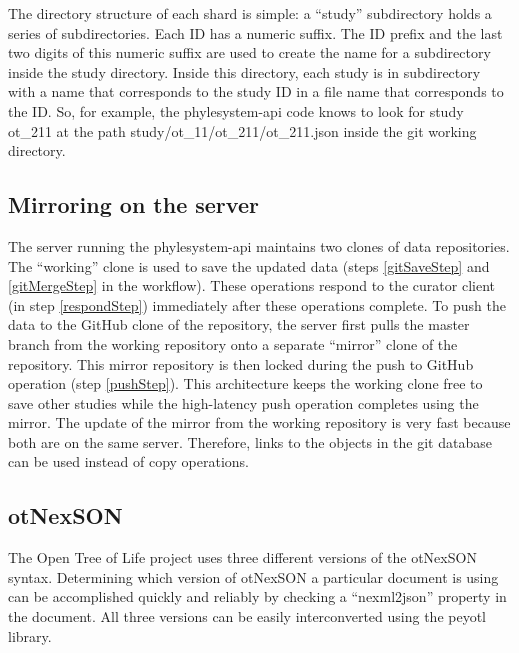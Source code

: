 \documentclass{bioinfo}
\newcommand{\ps}{phylesystem\xspace}
\newcommand{\otol}{Open Tree of Life\xspace}
\newcommand{\nexson}{otNexSON\xspace}
\begin{document}
\begin{methods}
The directory structure of each shard is simple: a ``study'' subdirectory holds 
a series of subdirectories.
Each ID has a numeric suffix.
The ID prefix and the last two digits of this numeric suffix are used to create the name
    for a subdirectory inside the study directory.
Inside this directory, each study is in subdirectory with a name that corresponds to the study ID
    in a file name that corresponds to the ID.
So, for example, the \ps-api code knows to look for study ot\_211 at the path
    study/ot\_11/ot\_211/ot\_211.json inside the git working directory.
\subsection*{Mirroring on the server}
The server running the \ps-api maintains two clones of data repositories.
The ``working'' clone is used to save the updated data (steps \ref{gitSaveStep} and \ref{gitMergeStep} in the workflow).
These operations respond to the curator client (in step \ref{respondStep}) immediately
    after these operations complete.
To push the data to the GitHub clone of the repository, the server first pulls the master branch from the working repository onto a separate
    ``mirror'' clone of the repository.
This mirror repository is then locked during the push to GitHub operation (step \ref{pushStep}).
This architecture keeps the working clone free to save other studies while the high-latency push operation completes using the mirror.
The update of the mirror from the working repository is very fast because both are on the same server.
Therefore, links to the objects in the git database can be used instead of copy operations.

\subsection*{\nexson}
The \otol project uses three different versions of the \nexson syntax.
Determining which version of \nexson a particular document is using
    can be accomplished quickly and reliably by checking a  ``nexml2json'' property in the document.
All three versions can be easily interconverted using the peyotl library.


\end{methods}
\end{document}
